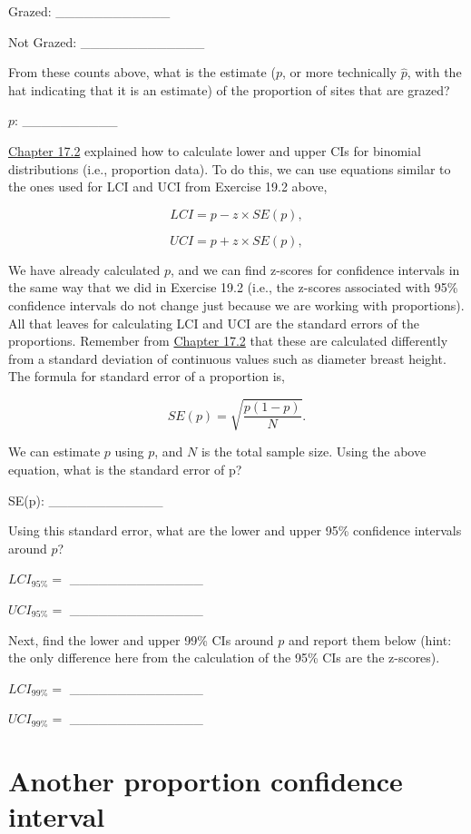 \documentclass[
]{scrbook}
\begin{document}
Grazed: \_\_\_\_\_\_\_\_\_\_\_\_

Not Grazed: \_\_\_\_\_\_\_\_\_\_\_\_\_

From these counts above, what is the estimate (\(p\), or more technically \(\hat{p}\), with the hat indicating that it is an estimate) of the proportion of sites that are grazed?

\(p\): \_\_\_\_\_\_\_\_\_\_

\href{Chapter_17.html\#binomial-distribution-cis}{Chapter 17.2} explained how to calculate lower and upper CIs for binomial distributions (i.e., proportion data).
To do this, we can use equations similar to the ones used for LCI and UCI from Exercise 19.2 above,

\[LCI = p - z \times SE(p),\]

\[UCI = p + z \times SE(p),\]

We have already calculated \(p\), and we can find z-scores for confidence intervals in the same way that we did in Exercise 19.2 (i.e., the z-scores associated with 95\% confidence intervals do not change just because we are working with proportions).
All that leaves for calculating LCI and UCI are the standard errors of the proportions.
Remember from \href{Chapter_17.html\#binomial-distribution-cis}{Chapter 17.2} that these are calculated differently from a standard deviation of continuous values such as diameter breast height.
The formula for standard error of a proportion is,

\[SE(p) = \sqrt{\frac{p\left(1 - p\right)}{N}}.\]

We can estimate \(p\) using \(p\), and \(N\) is the total sample size.
Using the above equation, what is the standard error of p?

SE(p): \_\_\_\_\_\_\_\_\_\_\_\_

Using this standard error, what are the lower and upper 95\% confidence intervals around \(p\)?

\(LCI_{95\%} =\) \_\_\_\_\_\_\_\_\_\_\_\_\_\_

\(UCI_{95\%} =\) \_\_\_\_\_\_\_\_\_\_\_\_\_\_

Next, find the lower and upper 99\% CIs around \(p\) and report them below (hint: the only difference here from the calculation of the 95\% CIs are the z-scores).

\(LCI_{99\%} =\) \_\_\_\_\_\_\_\_\_\_\_\_\_\_

\(UCI_{99\%} =\) \_\_\_\_\_\_\_\_\_\_\_\_\_\_

\hypertarget{another-proportion-confidence-interval}{%
\section{Another proportion confidence interval}\label{another-proportion-confidence-interval}}
\end{document}
